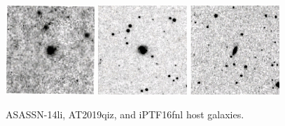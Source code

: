 \documentclass[a4paper,11pt]{article}
\begin{document}
\begin{figure}[h]
  \centering
  \includegraphics[width=0.3\textwidth]{ASASSN-14li_host_red}
  \includegraphics[width=0.3\textwidth]{AT2019qiz_host_red}
  \includegraphics[width=0.3\textwidth]{iPTF16fnl_host_red}
  \caption{ASASSN-14li, AT2019qiz, and iPTF16fnl host galaxies.}
  \label{fig:xshooter_hosts}
\end{figure}

\end{document}
